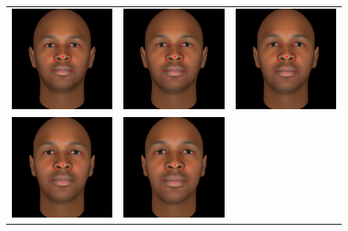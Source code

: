\documentclass[runningheads]{llncs}
\begin{document}
\begin{figure}[ht!]
\centering
\begin{tabular}{ccc}
\includegraphics[width=.33\linewidth]{resources/figures/extracted_fiducial_0006.png} &
\includegraphics[width=.33\linewidth]{resources/figures/extracted_fiducial_0008.png} &
\includegraphics[width=.33\linewidth]{resources/figures/extracted_fiducial_0001.png} \\
\includegraphics[width=.33\linewidth]{resources/figures/extracted_fiducial_0002.png} &
\includegraphics[width=.33\linewidth]{resources/figures/extracted_fiducial_0003.png} &

\end{tabular}
\end{figure}
\end{document}
